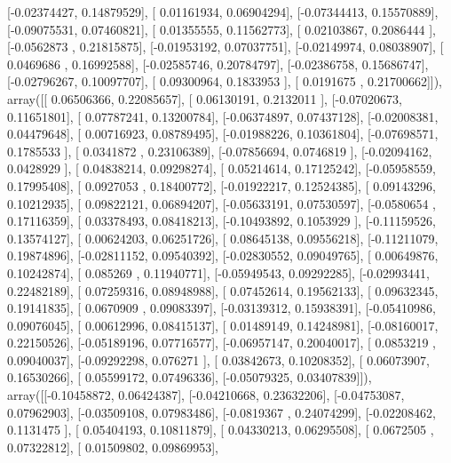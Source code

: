 \documentclass{article}
\begin{document}
       [-0.02374427,  0.14879529],
       [ 0.01161934,  0.06904294],
       [-0.07344413,  0.15570889],
       [-0.09075531,  0.07460821],
       [ 0.01355555,  0.11562773],
       [ 0.02103867,  0.2086444 ],
       [-0.0562873 ,  0.21815875],
       [-0.01953192,  0.07037751],
       [-0.02149974,  0.08038907],
       [ 0.0469686 ,  0.16992588],
       [-0.02585746,  0.20784797],
       [-0.02386758,  0.15686747],
       [-0.02796267,  0.10097707],
       [ 0.09300964,  0.1833953 ],
       [ 0.0191675 ,  0.21700662]]), array([[ 0.06506366,  0.22085657],
       [ 0.06130191,  0.2132011 ],
       [-0.07020673,  0.11651801],
       [ 0.07787241,  0.13200784],
       [-0.06374897,  0.07437128],
       [-0.02008381,  0.04479648],
       [ 0.00716923,  0.08789495],
       [-0.01988226,  0.10361804],
       [-0.07698571,  0.1785533 ],
       [ 0.0341872 ,  0.23106389],
       [-0.07856694,  0.0746819 ],
       [-0.02094162,  0.0428929 ],
       [ 0.04838214,  0.09298274],
       [ 0.05214614,  0.17125242],
       [-0.05958559,  0.17995408],
       [ 0.0927053 ,  0.18400772],
       [-0.01922217,  0.12524385],
       [ 0.09143296,  0.10212935],
       [ 0.09822121,  0.06894207],
       [-0.05633191,  0.07530597],
       [-0.0580654 ,  0.17116359],
       [ 0.03378493,  0.08418213],
       [-0.10493892,  0.1053929 ],
       [-0.11159526,  0.13574127],
       [ 0.00624203,  0.06251726],
       [ 0.08645138,  0.09556218],
       [-0.11211079,  0.19874896],
       [-0.02811152,  0.09540392],
       [-0.02830552,  0.09049765],
       [ 0.00649876,  0.10242874],
       [ 0.085269  ,  0.11940771],
       [-0.05949543,  0.09292285],
       [-0.02993441,  0.22482189],
       [ 0.07259316,  0.08948988],
       [ 0.07452614,  0.19562133],
       [ 0.09632345,  0.19141835],
       [ 0.0670909 ,  0.09083397],
       [-0.03139312,  0.15938391],
       [-0.05410986,  0.09076045],
       [ 0.00612996,  0.08415137],
       [ 0.01489149,  0.14248981],
       [-0.08160017,  0.22150526],
       [-0.05189196,  0.07716577],
       [-0.06957147,  0.20040017],
       [ 0.0853219 ,  0.09040037],
       [-0.09292298,  0.076271  ],
       [ 0.03842673,  0.10208352],
       [ 0.06073907,  0.16530266],
       [ 0.05599172,  0.07496336],
       [-0.05079325,  0.03407839]]), array([[-0.10458872,  0.06424387],
       [-0.04210668,  0.23632206],
       [-0.04753087,  0.07962903],
       [-0.03509108,  0.07983486],
       [-0.0819367 ,  0.24074299],
       [-0.02208462,  0.1131475 ],
       [ 0.05404193,  0.10811879],
       [ 0.04330213,  0.06295508],
       [ 0.0672505 ,  0.07322812],
       [ 0.01509802,  0.09869953],
\end{document}

